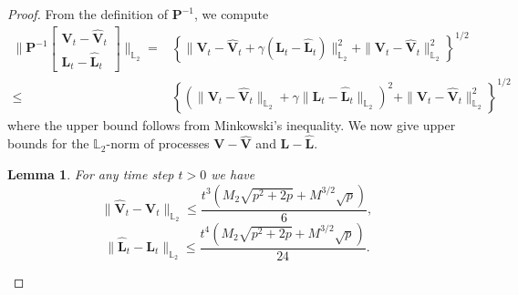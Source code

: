 \documentclass[a4paper,bej,preprint,reqno]{imsart}
\newcommand\bfP{\mathbf P}
\newcommand\bL{\boldsymbol L}
\newcommand\bV{\boldsymbol V}
\newcommand\LL{\mathbb L}
\def\hat{\widehat}
\newtheorem{lemma}{Lemma}
\begin{document}
\begin{proof}
From the definition of $\bfP^{-1}$, we compute
\begin{align}
    \bigg\|\bfP^{-1}\begin{bmatrix}
     \bV_t-\hat{\bV}_t \\
      \bL_t-\hat{\bL}_t
\end{bmatrix}\bigg\|_{{\LL}_2}=&\left\{\|\bV_t-\hat{\bV}_t+\gamma(\bL_t-\hat{\bL}_t)\|_{{\LL}_2}^2+\|\bV_t-\hat{\bV}_t\|_{{\LL}_2}^2\right\}^{1/2}\\
\le&\left\{\left(\|\bV_t-\hat{\bV}_t\|_{{\LL}_2}+\gamma\|\bL_t-\hat{\bL}_t\|_{{\LL}_2}\right)^2+\|\bV_t-\hat{\bV}_t\|_{{\LL}_2}^2\right\}^{1/2}
\end{align}
where the upper bound follows from Minkowski's inequality. We now give upper bounds for the ${\LL}_2$-norm of processes $\bV-\hat{\bV}$ and $\bL-\hat{\bL}$.
\begin{lemma}
For any time step $t>0$ we have
$$\|\hat{\bV}_t-\bV_t\|_{{\LL}_2}\le\frac{t^3(M_2\sqrt{p^2+2p}+M^{3/2}\sqrt{p})}{6},$$
$$\|\hat{\bL}_t-\bL_t\|_{{\LL}_2}\le\frac{t^4(M_2\sqrt{p^2+2p}+M^{3/2}\sqrt{p})}{24}.
$$
\end{lemma}


\end{proof}
\end{document}
